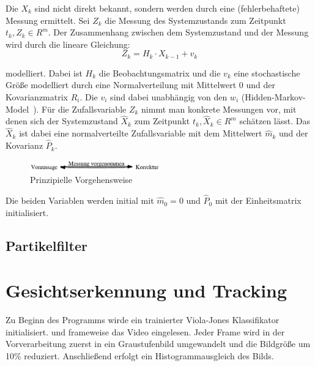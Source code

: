 \documentclass[a4paper, 11pt, twocolumn]{article}
\begin{document}
Die $X_k$ sind nicht direkt bekannt, sondern werden durch eine (fehlerbehaftete) Messung ermittelt. Sei $Z_k$ die Messung des Systemzustands zum Zeitpunkt $t_k, Z_k \in R^m$. Der Zusammenhang zwischen dem Systemzustand und der Messung wird durch die lineare Gleichung:
\[
	Z_k = H_k \cdot X_{k-1} + v_k
\]

modelliert. Dabei ist $H_k$ die Beobachtungsmatrix und die $v_k$ eine stochastische Größe modelliert durch eine Normalverteilung mit Mittelwert 0 und der Kovarianzmatrix $R_i$. Die $v_i$ sind dabei unabhängig von den $w_i$ (Hidden-Markov-Model~\cite{MarslandBook}). Für die Zufallsvariable $Z_k$ nimmt man konkrete Messungen vor, mit denen sich der Systemzustand $\widehat{X}_k$ zum Zeitpunkt $t_k, \widehat{X}_k \in R^m$ schätzen lässt. Das $\widehat{X}_k$ ist dabei eine normalverteilte Zufallsvariable mit dem Mittelwert $\widehat{m}_k$ und der Kovarianz $\widehat{P}_k$.
\begin{figure}[htpb]
	\centering
	\includegraphics[width=0.5\textwidth]{kalman.eps}
	\caption{Prinzipielle Vorgehensweise}
	\label{fig:kalman}
\end{figure}

Die beiden Variablen werden initial mit $\widehat{m}_0 = 0$ und $\widehat{P}_0$ mit der Einheitsmatrix initialisiert. 


\subsection{Partikelfilter} %
\label{sub:partikelfilter}



\section{Gesichtserkennung und Tracking} %
\label{sec:gesichtserkennung_und_tracking}

Zu Beginn des Programms wirde ein trainierter Viola-Jones Klassifikator initialisiert.  und frameweise das Video eingelesen. Jeder Frame wird in der Vorverarbeitung zuerst in ein Graustufenbild umgewandelt und die Bildgröße um 10\% reduziert. Anschließend erfolgt ein Histogrammausgleich des Bilds.
\end{document}

